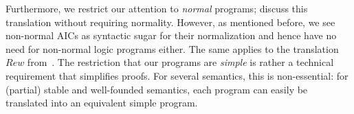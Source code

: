 Furthermore, we restrict our attention to \emph{normal} programs; \citet{tplp/CaropreseT11} discuss this translation without requiring normality. However, as mentioned before, we see non-normal AICs as syntactic sugar for their normalization and hence have no need for non-normal logic programs either. The same applies to the translation $\mathit{Rew}$ from~\cite{iclp/CaropreseGSZ06}.
The restriction that our programs are \emph{simple} is rather a technical requirement that simplifies proofs. For several semantics, this is non-essential: for (partial) stable and well-founded semantics, each program can easily be translated into an equivalent simple program.  


